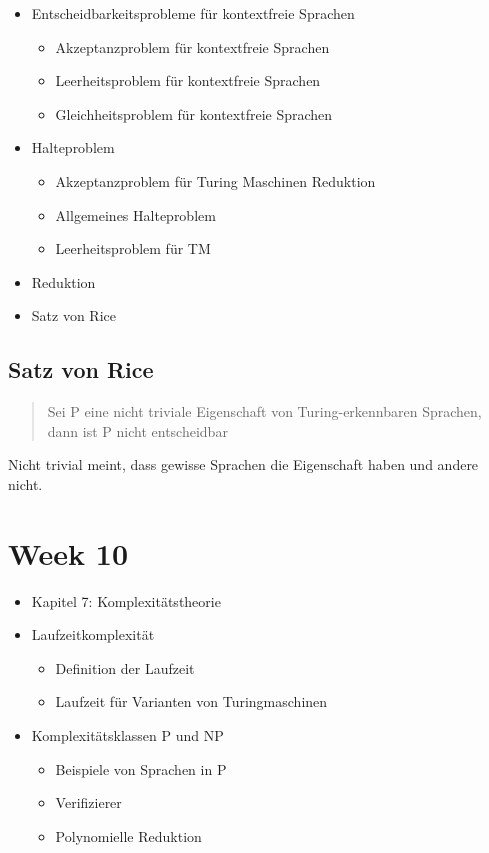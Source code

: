 \documentclass[11pt,twoside,landscape]{article}
\begin{document}
\begin{multicols}{3}
\begin{itemize}
\item Entscheidbarkeitsprobleme für kontextfreie Sprachen
\begin{itemize}
\item Akzeptanzproblem für kontextfreie Sprachen
\item Leerheitsproblem für kontextfreie Sprachen
\item Gleichheitsproblem für kontextfreie Sprachen
\end{itemize}

\item Halteproblem
\begin{itemize}
\item Akzeptanzproblem für Turing Maschinen Reduktion
\item Allgemeines Halteproblem
\item Leerheitsproblem für TM
\end{itemize}
\item Reduktion
\item Satz von Rice
\end{itemize}


\subsection*{Satz von Rice}
\label{sec:orgfef1258}
\begin{quote}
Sei P eine nicht triviale Eigenschaft von Turing-erkennbaren Sprachen, dann
ist P nicht entscheidbar
\end{quote}
Nicht trivial meint, dass gewisse Sprachen die Eigenschaft haben und andere nicht.

\section*{Week 10}
\label{sec:org30cd285}
\begin{itemize}
\item Kapitel 7: Komplexitätstheorie
\item Laufzeitkomplexität
\begin{itemize}
\item Definition der Laufzeit
\item Laufzeit für Varianten von Turingmaschinen
\end{itemize}

\item Komplexitätsklassen P und NP
\begin{itemize}
\item Beispiele von Sprachen in P
\item Verifizierer
\item Polynomielle Reduktion
\end{itemize}
\end{itemize}



\end{multicols}
\end{document}
